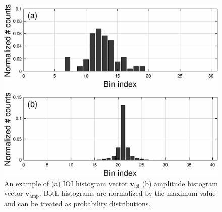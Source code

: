 \documentclass[conference]{IEEEtran}
\begin{document}
\begin{figure}
    \centering
    \includegraphics[width = 8 cm]{./figs/ioi_hist_examples.eps}
    \caption{An example of (a) IOI histogram vector $\mathbf{v}_\mathrm{ioi}$ (b) amplitude histogram vector $\mathbf{v}_\mathrm{amp}$. Both histograms are normalized by the maximum value and can be treated as probability distributions.} 
    \label{fig:ioi_hist_example}
\end{figure}
\end{document}
